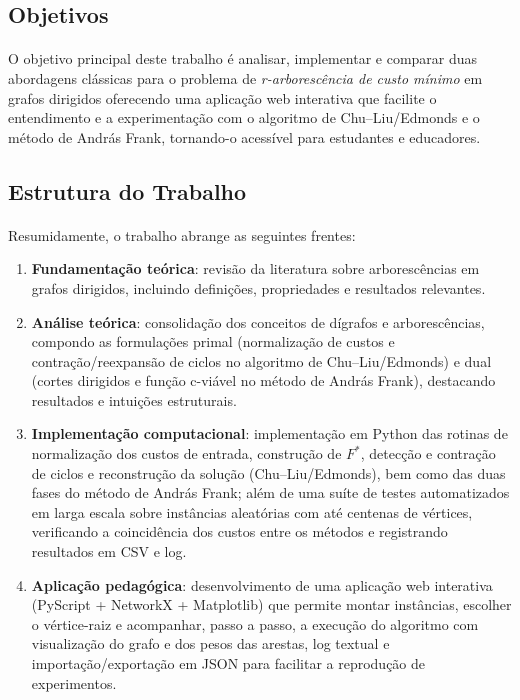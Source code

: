 \documentclass[12pt,a4paper]{article}
\begin{document}
\subsection{Objetivos}

\paragraph{}
O objetivo principal deste trabalho é analisar, implementar e comparar duas abordagens clássicas para o problema de \textit{r-arborescência de custo mínimo} em grafos dirigidos oferecendo uma aplicação web interativa que facilite o entendimento e a experimentação com o algoritmo de Chu--Liu/Edmonds e o método de András Frank, tornando-o acessível para estudantes e educadores.

\subsection{Estrutura do Trabalho}
\paragraph{}
Resumidamente, o trabalho abrange as seguintes frentes:  

\begin{enumerate}
    \item \textbf{Fundamentação teórica}: revisão da literatura sobre arborescências em grafos dirigidos, incluindo definições, propriedades e resultados relevantes.
    \item \textbf{Análise teórica}: consolidação dos conceitos de dígrafos e arborescências, compondo as formulações primal (normalização de custos e contração/reexpansão de ciclos no algoritmo de Chu--Liu/Edmonds) e dual (cortes dirigidos e função c-viável no método de András Frank), destacando resultados e intuições estruturais.
    \item \textbf{Implementação computacional}: implementação em Python das rotinas de normalização dos custos de entrada, construção de \(F^\ast\), detecção e contração de ciclos e reconstrução da solução (Chu--Liu/Edmonds), bem como das duas fases do método de András Frank; além de uma suíte de testes automatizados em larga escala sobre instâncias aleatórias com até centenas de vértices, verificando a coincidência dos custos entre os métodos e registrando resultados em CSV e log.
    \item \textbf{Aplicação pedagógica}: desenvolvimento de uma aplicação web interativa (PyScript + NetworkX + Matplotlib) que permite montar instâncias, escolher o vértice-raiz e acompanhar, passo a passo, a execução do algoritmo com visualização do grafo e dos pesos das arestas, log textual e importação/exportação em JSON para facilitar a reprodução de experimentos.
\end{enumerate}
\end{document}
